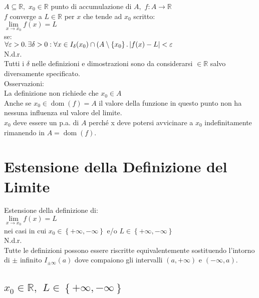 \documentclass[a4paper, twoside, italian, 11pt]{book}
\newcommand{\braces}[1] {\left \{ #1 \right \}}
\newcommand{\abs}[1] {\left | #1 \right |}
\DeclareMathOperator{\dom}{dom}
\newcommand{\R}{\mathbb{R}}
\begin{document}
\noindent
$A \subseteq \R,$ $x_0 \in \R$ punto di accumulazione di $A,$ $f: A \rightarrow \R$ \\

$f$ converge a $L \in \R$ per $x$ che tende ad $x_0$ scritto: \\

$\lim\limits_{x \to x_0} f(x) = L$ \\

\noindent
se: \\

$\forall \varepsilon > 0 \ldotp \exists \delta > 0 : \forall x \in I_\delta(x_0) \cap (A \setminus \braces{x_0} \ldotp \abs{f(x) - L} < \varepsilon$ \\

\noindent
N.d.r. \\
Tutti i $\delta$ nelle definizioni e dimostrazioni sono da considerarsi $\in \R$ salvo diversamente specificato. \\

\noindent
Osservazioni: \\
La definizione non richiede che $x_0 \in A$ \\
Anche se $x_0 \in \dom(f) = A$ il valore della funzione in questo punto non ha nessuna influenza sul valore del limite. \\
$x_0$ deve essere un p.a. di $A$ perché x deve potersi avvicinare a $x_0$ indefinitamente rimanendo in $A = \dom(f)$.



\section{Estensione della Definizione del Limite}

\noindent
Estensione della definizione di: \\

$\lim\limits_{x \to x_0} f(x) = L$ \\

\noindent
nei casi in cui $x_0 \in \braces{+\infty, -\infty}$ e/o $L \in \braces{+\infty, -\infty}$ \\

\noindent
N.d.r. \\
Tutte le definizioni possono essere riscritte equivalentemente sostituendo l'intorno di $\pm$ infinito $I_{\pm \infty}(a)$ dove compaiono gli intervalli $(a, +\infty)$ e $(-\infty, a)$.


\subsection{$x_0 \in \R,$ $L \in \braces{+\infty, -\infty}$}
\end{document}

